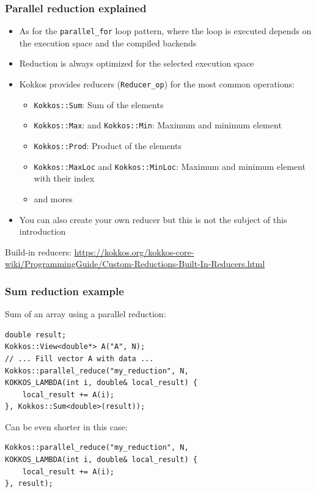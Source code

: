 \documentclass[aspectratio=169]{beamer}
\begin{document}
\begin{frame}[fragile]
    \frametitle{Parallel reduction explained}

\begin{itemize}
    \item As for the \texttt{parallel\_for} loop pattern, where the loop is executed depends on the execution space and the compiled backends
    \item Reduction is always optimized for the selected execution space
    \item Kokkos provides reducers (\texttt{Reducer\_op}) for the most common operations:
    \begin{itemize}
        \item \texttt{Kokkos::Sum}: Sum of the elements
        \item \texttt{Kokkos::Max}: and \texttt{Kokkos::Min}: Maximum and minimum element
        \item \texttt{Kokkos::Prod}: Product of the elements
        \item \texttt{Kokkos::MaxLoc} and \texttt{Kokkos::MinLoc}: Maximum and minimum element with their index
        \item and mores
    \end{itemize}  
    \item You can also create your own reducer but this is not the subject of this introduction
\end{itemize}

\begin{block}{}
    Build-in reducers: \href{https://kokkos.org/kokkos-core-wiki/ProgrammingGuide/Custom-Reductions-Built-In-Reducers.html}{https://kokkos.org/kokkos-core-wiki/ProgrammingGuide/Custom-Reductions-Built-In-Reducers.html}
\end{block}

\end{frame}


\begin{frame}[fragile]
    \frametitle{Sum reduction example}

Sum of an array using a parallel reduction:

\footnotesize
\begin{verbatim}
double result;
Kokkos::View<double*> A("A", N);
// ... Fill vector A with data ...
Kokkos::parallel_reduce("my_reduction", N,
KOKKOS_LAMBDA(int i, double& local_result) {
    local_result += A(i);
}, Kokkos::Sum<double>(result));
\end{verbatim}

\normalsize
Can be even shorter in this case:

\footnotesize
\begin{verbatim}
Kokkos::parallel_reduce("my_reduction", N,
KOKKOS_LAMBDA(int i, double& local_result) {
    local_result += A(i);
}, result);
\end{verbatim}

\end{frame}
\end{document}
